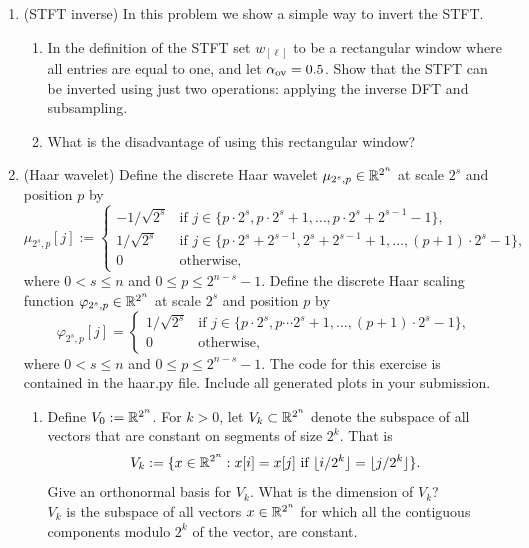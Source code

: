 \documentclass[12pt,twoside]{article}
\begin{document}
\begin{enumerate}
\begin{enumerate}
 \end{enumerate}
  
 \newpage
 \item (STFT inverse) In this problem we show a simple way to invert the STFT.
 \begin{enumerate}
  \item In the definition of the STFT set $w_{[\ell]}$ to be a rectangular window where all entries are equal to one, and let $\alpha_{\operatorname{ov}}=0.5$. Show that the STFT can be inverted using just two operations: applying the inverse DFT and subsampling.
  \item What is the disadvantage of using this rectangular window?
  \end{enumerate}
 
  \newpage
 \item (Haar wavelet) Define the discrete Haar wavelet $\mu_{2^s,p}\in\mathbb{R}^{2^n}$ at scale
  $2^s$ and position $p$ by
  $$\mu_{2^s,p}[j] :=
  \begin{cases}
    -1/\sqrt{2^{s}} & \text{if $j\in\{p\cdot 2^s,p\cdot 2^s+1,\ldots,p\cdot 2^s+2^{s-1}-1\}$,}\\
    1/\sqrt{2^{s}} & \text{if $j\in\{p\cdot 2^s+2^{s-1},2^s+2^{s-1}+1,\ldots,(p+1)\cdot2^{s}-1\}$,}\\
    0 & \text{otherwise,}
  \end{cases}
  $$
  where $0<s\leq n$ and $0 \leq p \leq 2^{n-s}-1$.  Define the
  discrete Haar scaling function $\varphi_{2^s,p}\in\mathbb{R}^{2^n}$ at scale $2^s$ and position $p$  by
  $$\varphi_{2^s,p}[j]=
  \begin{cases}
    1/\sqrt{2^{s}} & \text{if $j\in\{p\cdot 2^s,p\cdots 2^s+1,\ldots,(p+1)\cdot 2^{s}-1\}$,}\\
    0 & \text{otherwise,}
  \end{cases}$$
  where $0<s\leq n$ and $0\leq p\leq 2^{n-s}-1$.
  The code for this
  exercise is contained in the haar.py file. Include all generated plots in your submission.
  \begin{enumerate}
  \item Define $V_0:=\mathbb{R}^{2^n}$.  For $k>0$, let $V_k\subset\mathbb{R}^{2^n}$ denote the subspace
    of all vectors that are constant on segments of size $2^k$.  That
    is
    $$V_k := \{x\in\mathbb{R}^{2^n}: \text{$x[i] = x[j]$ if $\lfloor
      i/2^k\rfloor = \lfloor j/2^k\rfloor$}\}.$$
    Give an orthonormal basis for $V_k$.  What is the dimension of
    $V_k$? \\
    $V_k$ is the subspace of all vectors $x\in\mathbb{R}^{2^n}$ for which all the contiguous components modulo $2^k$ of the vector, are constant.

\end{enumerate}
\end{enumerate}
\end{document}
